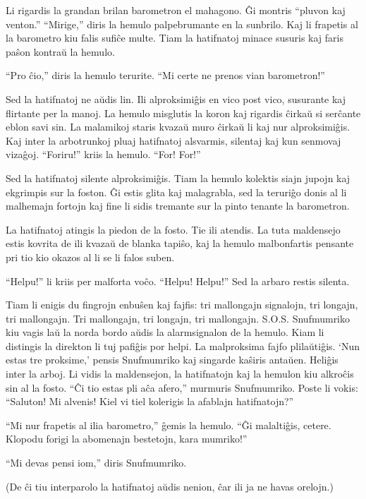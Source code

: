 Li rigardis la grandan brilan barometron el mahagono. Ĝi montris ``pluvon kaj venton.'' ``Mirige,'' diris la hemulo palpebrumante en la sunbrilo. Kaj li frapetis al la barometro kiu falis sufiĉe multe. Tiam la hatifnatoj minace susuris kaj faris paŝon kontraŭ la hemulo.

``Pro ĉio,'' diris la hemulo terurite. ``Mi certe ne prenos vian barometron!''

Sed la hatifnatoj ne aŭdis lin. Ili alproksimiĝis en vico post vico, susurante kaj flirtante per la manoj. La hemulo misglutis la koron kaj rigardis ĉirkaŭ si serĉante eblon savi sin. La malamikoj staris kvazaŭ muro ĉirkaŭ li kaj nur alproksimiĝis. Kaj inter la arbotrunkoj pluaj hatifnatoj alsvarmis, silentaj kaj kun senmovaj vizaĝoj. ``Foriru!'' kriis la hemulo. ``For! For!''

Sed la hatifnatoj silente alproksimiĝis. Tiam la hemulo kolektis siajn jupojn kaj ekgrimpis sur la foston. Ĝi estis glita kaj malagrabla, sed la teruriĝo donis al li malhemajn fortojn kaj fine li sidis tremante sur la pinto tenante la barometron.

La hatifnatoj atingis la piedon de la fosto. Tie ili atendis. La tuta maldensejo estis kovrita de ili kvazaŭ de blanka tapiŝo, kaj la hemulo malbonfartis pensante pri tio kio okazos al li se li falos suben.

``Helpu!'' li kriis per malforta voĉo. ``Helpu! Helpu!'' Sed la arbaro restis silenta.

Tiam li enigis du fingrojn enbuŝen kaj fajfis: tri mallongajn signalojn, tri longajn, tri mallongajn. Tri mallongajn, tri longajn, tri mallongajn. S.O.S.
\sectionbreak
Snufmumriko kiu vagis laŭ la norda bordo aŭdis la alarmsignalon de la hemulo. Kiam li distingis la direkton li tuj pafiĝis por helpi. La malproksima fajfo plilaŭtiĝis. `Nun estas tre proksime,' pensis Snufmumriko kaj singarde kaŝiris antaŭen. Heliĝis inter la arboj. Li vidis la maldensejon, la hatifnatojn kaj la hemulon kiu alkroĉis sin al la fosto. ``Ĉi tio estas pli aĉa afero,'' murmuris Snufmumriko. Poste li vokis: ``Saluton! Mi alvenis! Kiel vi tiel kolerigis la afablajn hatifnatojn?''

``Mi nur frapetis al ilia barometro,'' ĝemis la hemulo. ``Ĝi malaltiĝis, cetere. Klopodu forigi la abomenajn bestetojn, kara mumriko!''

``Mi devas pensi iom,'' diris Snufmumriko.

(De ĉi tiu interparolo la hatifnatoj aŭdis nenion, ĉar ili ja ne havas orelojn.)

